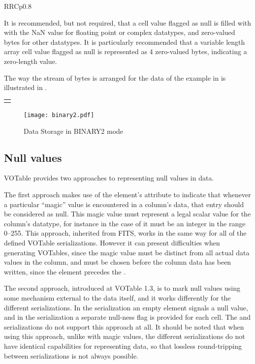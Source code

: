 \begin{tabular}{RRCp{0.8\textwidth}}
\begin{center}
{It is recommended, but not required, that a cell value flagged as null
is filled with with the NaN value for floating point or complex datatypes,
and zero-valued bytes for other datatypes.
It is particularly recommended that a variable length array cell value
flagged as null is represented as 4 zero-valued bytes, indicating
a zero-length value.

The way the stream of bytes is arranged for the data of the
example in  is illustrated in
.

\label{Image3}
\ifhtx\begin{tabular}{c}
\tag{IMG SRC="binary2.png" NAME="Image3" ALIGN=LEFT BORDER=0}\end{tabular}
\else\begin{center}
\begin{figure}[htb]
\texttt{[image: binary2.pdf]}
\caption{\label{fig:bin2}Data Storage in BINARY2 mode}
\end{figure}\end{center}
\fi

\subsection{Null values}
\label{sec:NULL}

VOTable provides two approaches to representing null values in data.

The first approach makes use of the  element's 
attribute to indicate that whenever a particular ``magic'' value is
encountered in a column's data, that entry should be considered as null.
This magic value must represent a legal scalar value for the column's
datatype, for instance in the case of {}
it must be an integer in the range 0--255.
This approach, inherited from FITS, works in the same way for all
of the defined VOTable serializations.
However it can present difficulties when generating VOTables,
since the magic value must be distinct from all actual data values
in the column, and must be chosen before the column data has
been written, since the  element precedes the .

The second approach, introduced at VOTable 1.3,
is to mark null values using some mechanism external
to the data itself, and it works differently for the different serializations.
In the  serialization
an empty  element signals a null value, and
in the  serialization
a separate null-ness flag is provided for each cell.
The  and  serializations do not support this approach
at all.
It should be noted that when using this approach, unlike with magic values,
the different serializations do not have identical capabilities for
representing data, so that lossless round-tripping between serializations
is not always possible.

}
\end{center}
\end{tabular}

